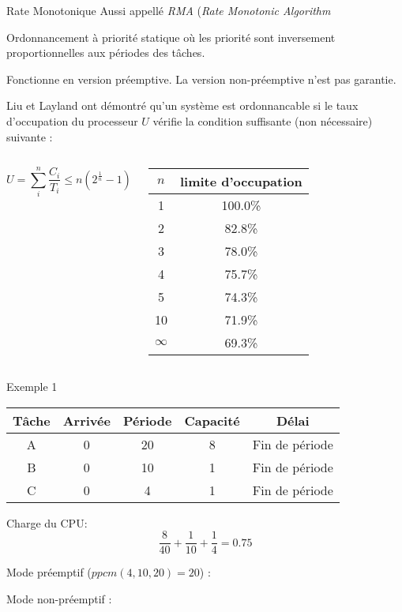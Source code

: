 \begin{frame}{Rate Monotonique}
  Aussi appellé \emph{RMA} (\emph{Rate Monotonic Algorithm}

  Ordonnancement à priorité statique où les priorité sont inversement
  proportionnelles aux périodes des tâches. 

  Fonctionne  en version préemptive.  La version  non-préemptive n'est
  pas garantie.

  Liu et Layland ont démontré qu'un système est ordonnancable si le
  taux d'occupation du processeur $U$ vérifie la condition suffisante
  (non nécessaire) suivante :

  \begin{columns}
      $$U = \sum_i^n \frac{C_i}{T_i} ≤ n \left(2^{\frac{1}{n}}-1\right)$$

      \begin{center}
        \begin{tabular}{cc}
          \hline
          $n$ & limite d'occupation \\
          \hline
          1 & 100.0\% \\
          2 & 82.8\% \\
          3 & 78.0\% \\
          4 & 75.7\% \\
          5 & 74.3\% \\
          10 & 71.9\% \\
          $\infty$ & 69.3\%\\
          \hline
        \end{tabular}
      \end{center}
  \end{columns}
\end{frame}

\begin{frame}{Exemple 1}
  \begin{center}
    \begin{tabular}{ccccc}
      \hline
      Tâche & Arrivée & Période & Capacité & Délai \\
      \hline
      A & 0 & 20 & 8 & Fin de période\\
      B & 0 & 10 & 1 & Fin de période\\
      C & 0 &  4 & 1 & Fin de période\\
      \hline
    \end{tabular}
  \end{center}
  \begin{overprint}
    Charge du CPU:
    $$\frac{8}{40} + \frac{1}{10} + \frac{1}{4} = 0.75$$
    
    Mode préemptif ($ppcm(4, 10, 20) = 20$) :
    \begin{center}
      
    \end{center}

    Mode non-préemptif :
    \begin{center}
      
    \end{center}
  \end{overprint}
\end{frame}

